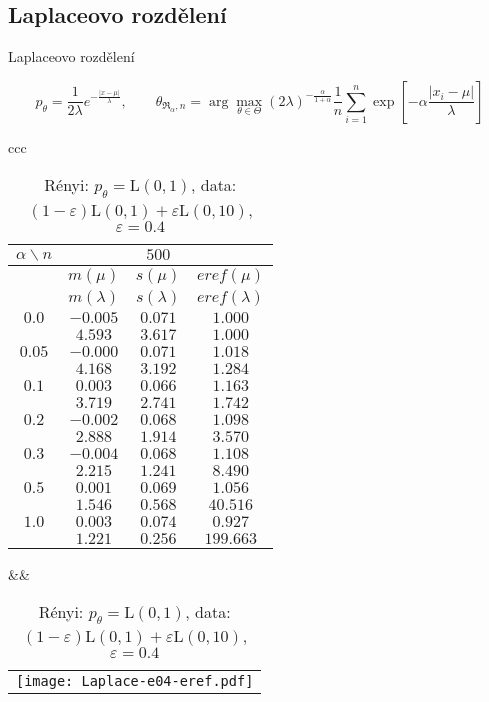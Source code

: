 \documentclass[11pt,a4paper]{beamer}
\newcommand{\amtiT}{\arg \max_{\theta \in \Theta}}
\begin{document}
\subsection{Laplaceovo rozdělení}    %
\begin{frame}{Laplaceovo rozdělení}

		{\footnotesize \[p_\theta = \frac{1}{2\lambda} e^{-\frac{|x-\mu|}{\lambda}},\qquad		\theta_{\mathfrak{R}_\alpha,n} = \amtiT (2\lambda)^{-\frac{\alpha}{1+\alpha}} \frac{1}{n} \sum_{i=1}^n \exp \left[-\alpha\frac{|x_i-\mu|}{\lambda} \right] \]}
\begin{table}[htb] \tiny
\begin{center}
\begin{tabular}{ccc}
	\begin{tabular}{|c|ccc|}
	\hline
	$\alpha\backslash n$ &&  $500$ & \\
	\hline
	& $m(\mu)$ & $s(\mu)$ & $eref(\mu)$ \\
	& $m(\lambda)$ & $s(\lambda)$ & $eref(\lambda)$ \\
	\hline
	$0.0$ & $ -0.005 $ & $ 0.071 $ & $ 1.000 $\\
	 & $ 4.593 $ & $ 3.617 $ & $ 1.000 $\\
	\hline
	$0.05$ & $ -0.000 $ & $ 0.071 $ & $ 1.018 $\\
	 & $ 4.168 $ & $ 3.192 $ & $ 1.284 $\\
	\hline
	$0.1$ & $ 0.003 $ & $ 0.066 $ & $ 1.163 $\\
	 & $ 3.719 $ & $ 2.741 $ & $ 1.742 $\\
	\hline
	$0.2$ & $ -0.002 $ & $ 0.068 $ & $ 1.098 $\\
	 & $ 2.888 $ & $ 1.914 $ & $ 3.570 $\\
	\hline
	$0.3$ & $ -0.004 $ & $ 0.068 $ & $ 1.108 $\\
	 & $ 2.215 $ & $ 1.241 $ & $ 8.490 $\\
	\hline
	$0.5$ & $ 0.001 $ & $ 0.069 $ & $ 1.056 $\\
	 & $ 1.546 $ & $ 0.568 $ & $ 40.516 $\\
	\hline
	$1.0$ & $ 0.003 $ & $ 0.074 $ & $ 0.927 $\\
	 & $ 1.221 $ & $ 0.256 $ & $ 199.663 $\\
	\hline
	\end{tabular}
&&
	\begin{tabular}{c}
		\texttt{[image: Laplace-e04-eref.pdf]}
	\end{tabular}
\\
\end{tabular}
\end{center}
\caption{\footnotesize R\'{e}nyi: $p_\theta = \mathrm{L}(0,1)$, data: $(1-\varepsilon)\mathrm{L}(0,1) + \varepsilon \mathrm{L}(0,10)$, $\varepsilon =  0.4$}
\label{tabJK:laplace-eref}
\end{table}

\end{frame}
\end{document}
